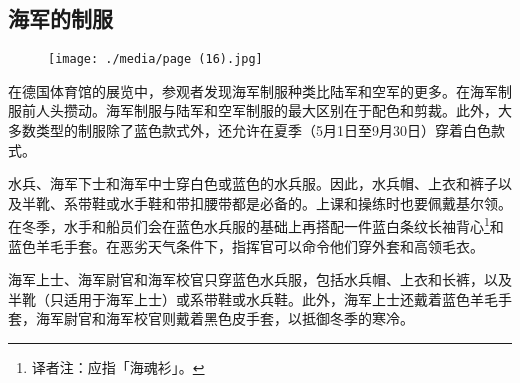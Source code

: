 \subsection{海军的制服}

\begin{figure}
\texttt{[image: ./media/page (16).jpg]}
\end{figure}

在德国体育馆的展览中，参观者发现海军制服种类比陆军和空军的更多。在海军制服前人头攒动。海军制服与陆军和空军制服的最大区别在于配色和剪裁。此外，大多数类型的制服除了蓝色款式外，还允许在夏季（5月1日至9月30日）穿着白色款式。

水兵、海军下士和海军中士穿白色或蓝色的水兵服。因此，水兵帽、上衣和裤子以及半靴、系带鞋或水手鞋和带扣腰带都是必备的。上课和操练时也要佩戴基尔领。在冬季，水手和船员们会在蓝色水兵服的基础上再搭配一件蓝白条纹长袖背心\footnote{译者注：应指「海魂衫」。}和蓝色羊毛手套。在恶劣天气条件下，指挥官可以命令他们穿外套和高领毛衣。

海军上士、海军尉官和海军校官只穿蓝色水兵服，包括水兵帽、上衣和长裤，以及半靴（只适用于海军上士）或系带鞋或水兵鞋。此外，海军上士还戴着蓝色羊毛手套，海军尉官和海军校官则戴着黑色皮手套，以抵御冬季的寒冷。

